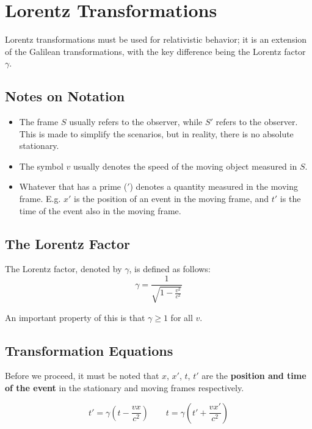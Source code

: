\documentclass[a4paper,12pt]{article}
\let\oldsection\section
\renewcommand\section{\clearpage\oldsection}
\newcommand{\paren}[1]{\left(#1\right)}
\begin{document}
\section{Lorentz Transformations}

Lorentz transformations must be used for relativistic behavior; it is an extension of the Galilean transformations, with the key difference being the Lorentz factor $\gamma$.

\subsection{Notes on Notation}
\begin{itemize}
  \item The frame $S$ usually refers to the  observer, while $S'$ refers to the  observer. This is made to simplify the scenarios, but in reality, there is no absolute stationary.
  \item The symbol $v$ usually denotes the speed of the moving object measured in $S$.
  \item Whatever that has a prime ($'$) denotes a quantity measured in the moving frame. E.g. $x'$ is the position of an event in the moving frame, and $t'$ is the time of the event also in the moving frame.
\end{itemize}

\subsection{The Lorentz Factor}

The Lorentz factor, denoted by $\gamma$, is defined as follows:
\begin{equation}\label{eq:lorentz}
  \gamma = \frac{1}{\sqrt{1 - \frac{v^2}{c^2}}}
\end{equation}

An important property of this is that $\gamma \geq 1$ for all $v$.
\pagebreak

\subsection{Transformation Equations}
Before we proceed, it must be noted that $x$, $x'$, $t$, $t'$ are the \textbf{position and time of the event} in the stationary and moving frames respectively.

\begin{equation}
  t' = \gamma \paren{t - \frac{vx}{c^2}} \quad \quad t = \gamma \paren{t' + \frac{vx'}{c^2}}
\end{equation}
\end{document}
